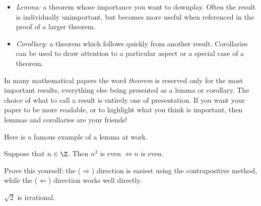 \begin{itemize}\setlength{\itemsep}{0pt}
  \item[]\emph{Lemma:} a theorem whose importance you want to downplay. Often the result is individually unimportant, but becomes more useful when referenced in the proof of a larger theorem.
  \item[]\emph{Corollary:} a theorem which follows quickly from another result. Corollaries can be used to draw attention to a particular aspect or a special case of a theorem.
\end{itemize}

\noindent In many mathematical papers the word \emph{theorem} is reserved only for the most important results, everything else being presented as a lemma or corollary. The choice of what to call a result is entirely one of presentation. If you want your paper to be more readable, or to highlight what you think is important, then lemmas and corollaries are your friends!\pagebreak[2]

\noindent Here is a famous example of a lemma at work.

\begin{lemm}\label{lemm:root2prep}
Suppose that $n\in\Z$. Then $n^2$ is even $\iff n$ is even.
\end{lemm}

\noindent Prove this yourself: the ($\Rightarrow$) direction is easiest using the contrapositive method, while the ($\Leftarrow$) direction works well directly.

\begin{thm}\label{thm:root2}
$\sqrt 2$ is irrational.
\end{thm}


